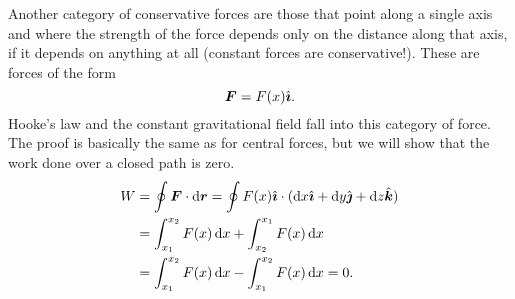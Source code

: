 \documentclass[../classical_mechanics.tex]{subfiles}
\begin{document}
            Another category of conservative forces are those that point along a single axis and where the strength of the force depends only on the distance along that axis, if it depends on anything at all (constant forces are conservative!).
            These are forces of the form
            \begin{equation}
                \boldsymbol{F}=F(x)\hat{\boldsymbol{\imath}}.
            \end{equation}
            Hooke's law and the constant gravitational field fall into this category of force.
            The proof is basically the same as for central forces, but we will show that the work done over a closed path is zero.
            \begin{align}
                W&=\oint\vec{F}\cdot\dd{\vec{r}}=\oint F(x)\ihat\cdot(\dd{x}\ihat+\dd{y}\jhat+\dd{z}\khat)\\
                &=\int_{x_1}^{x_2}F(x)\dd{x}+\int_{x_2}^{x_1}F(x)\dd{x}\\
                &=\int_{x_1}^{x_2}F(x)\dd{x}-\int_{x_1}^{x_2}F(x)\dd{x}=0.
            \end{align}

\end{document}
